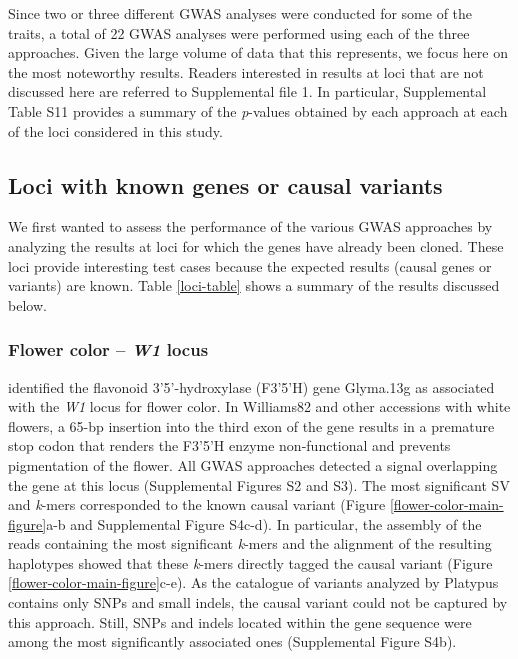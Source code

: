 \documentclass{article}
\begin{document}
Since two or three different GWAS analyses were conducted for some of the
traits, a total of 22 GWAS analyses were performed using each of the three
approaches.  Given the large volume of data that this represents, we focus here
on the most noteworthy results. Readers interested in results at loci that are
not discussed here are referred to Supplemental file 1. In particular, Supplemental Table
S11 provides a summary of the
\textit{p}-values obtained by each approach at each of the loci considered in
this study.

\subsection*{Loci with known genes or causal variants}

We first wanted to assess the performance of the various GWAS
approaches by analyzing the results at loci for which the genes have
already been cloned. These loci provide interesting test cases because
the expected results (causal genes or variants) are known. Table \ref{loci-table} shows
a summary of the results discussed below.

\subsubsection*{Flower color -- \textit{W1} locus}

 identified the flavonoid 3’5’-hydroxylase (F3’5’H) gene
Glyma.13g as associated with the \textit{W1} locus for flower color. In
Williams82 and other accessions with white flowers, a 65-bp insertion into the
third exon of the gene results in a premature stop codon that renders the
F3’5’H enzyme non-functional and prevents pigmentation of the flower. All
GWAS approaches detected a signal overlapping the gene at this locus (Supplemental Figures
S2 and S3). The most
significant SV and \textit{k}-mers corresponded to the known causal variant
(Figure \ref{flower-color-main-figure}a-b and Supplemental Figure S4c-d).
In particular, the assembly of the reads containing the most significant \textit{k}-mers
and the alignment of the resulting haplotypes showed that these \textit{k}-mers
directly tagged the causal variant (Figure \ref{flower-color-main-figure}c-e).
As the catalogue of variants analyzed by Platypus contains only SNPs and small
indels, the causal variant could not be captured by this approach. Still, SNPs
and indels located within the gene sequence were among the most significantly
associated ones (Supplemental Figure S4b).
\end{document}
